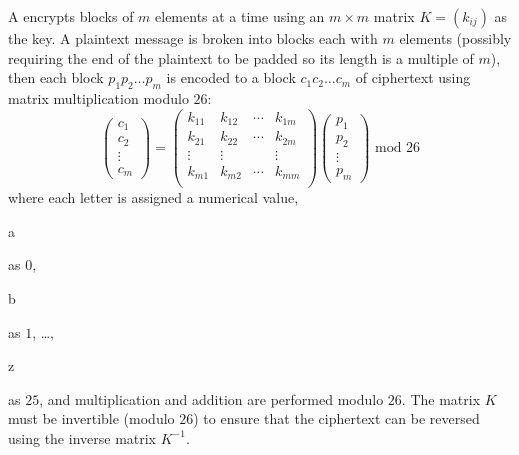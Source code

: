 A  encrypts blocks of $m$ elements at a time using an
$m\times m$ matrix $K=\left(k_{ij}\right)$ as the key.
A plaintext message is broken into blocks
each with $m$ elements (possibly requiring the end of the plaintext to be padded
so its length is a multiple of $m$), then each block $p_1p_2\dots p_m$ is encoded
to a block $c_1c_2\dots c_m$ of ciphertext using matrix multiplication modulo $26$:
\begin{displaymath}
  \left(\begin{array}{c}
    c_1 \\ c_2 \\ \vdots \\ c_m
  \end{array}\right)
  =
  \left(\begin{array}{cccc}
    k_{11} & k_{12} & \cdots & k_{1m} \\
    k_{21} & k_{22} & \cdots & k_{2m} \\
    \vdots & \vdots &        & \vdots \\
    k_{m1} & k_{m2} & \cdots & k_{mm} \\
  \end{array}\right)
  \left(\begin{array}{c}
    p_1 \\ p_2 \\ \vdots \\ p_m
  \end{array}\right)
  \mbox{ mod $26$}
\end{displaymath}
where each letter is assigned a numerical value, \begin{code}a\end{code} as $0$,
\begin{code}b\end{code} as $1$, \dots, \begin{code}z\end{code} as $25$, and multiplication
and addition are performed modulo $26$.
The matrix $K$ must be invertible (modulo $26$) to ensure that the ciphertext can be reversed
using the inverse matrix $K^{-1}$.

